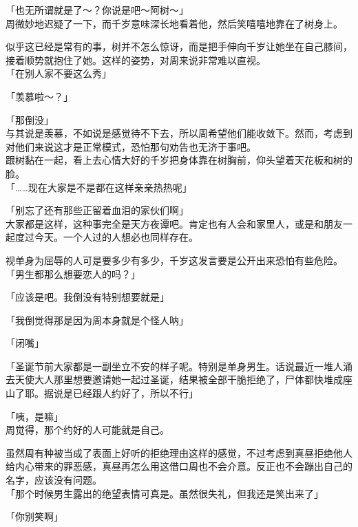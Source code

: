 「也无所谓就是了～？你说是吧～阿树～」\\

周微妙地迟疑了一下，而千岁意味深长地看着他，然后笑嘻嘻地靠在了树身上。

似乎这已经是常有的事，树并不怎么惊讶，而是把手伸向千岁让她坐在自己膝间，接着顺势就抱住了她。这样的姿势，对周来说非常难以直视。\\

「在别人家不要这么秀」

「羡慕啦～？」

「那倒没」\\

与其说是羡慕，不如说是感觉待不下去，所以周希望他们能收敛下。然而，考虑到对他们来说这才是正常模式，恐怕那句劝告也无济于事吧。\\

跟树黏在一起，看上去心情大好的千岁把身体靠在树胸前，仰头望着天花板和树的脸。\\

「……现在大家是不是都在这样亲亲热热呢」

「别忘了还有那些正留着血泪的家伙们啊」\\

大家都是这样，这种事完全是天方夜谭吧。肯定也有人会和家里人，或是和朋友一起度过今天。一个人过的人想必也同样存在。

视单身为屈辱的人可是要多少有多少，千岁这发言要是公开出来恐怕有些危险。\\

「男生都那么想要恋人的吗？」

「应该是吧。我倒没有特别想要就是」

「我倒觉得那是因为周本身就是个怪人呐」

「闭嘴」

「圣诞节前大家都是一副坐立不安的样子呢。特别是单身男生。话说最近一堆人涌去天使大人那里想要邀请她一起过圣诞，结果被全部干脆拒绝了，尸体都快堆成座山了耶。据说是已经跟人约好了，所以不行」

「咦，是嘛」\\

周觉得，那个约好的人可能就是自己。

虽然周有种被当成了表面上好听的拒绝理由这样的感觉，不过考虑到真昼拒绝他人给内心带来的罪恶感，真昼再怎么用这借口周也不会介意。反正也不会蹦出自己的名字，应该没有问题。\\

「那个时候男生露出的绝望表情可真是。虽然很失礼，但我还是笑出来了」

「你别笑啊」

